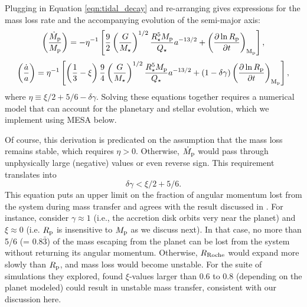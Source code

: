 \documentclass{svjour3}                     %
\begin{document}
Plugging in Equation \ref{eqn:tidal_decay} and re-arranging gives expressions for the mass loss rate and the accompanying evolution of the semi-major axis:
\begin{equation}
\left( \frac{\dot{M}_{\rm p}}{M_{\rm p}} \right) = -\eta^{-1} \left[ \frac{9}{2} \left( \frac{G}{M_{\star}} \right)^{1/2} \frac{R_{\star}^5 M_{\rm p}}{Q_{\star}} a^{-13/2} + \left( \frac{\partial \ln R_{\rm p}}{\partial t} \right)_{\rm M_{\rm p}} \right],
\label{eqn:RLO_mass_loss_rate}
\end{equation}
\begin{equation}
\left( \frac{\dot{a}}{a} \right) = \eta^{-1} \left[\left( \frac{1}{3} - \xi \right) \frac{9}{4} \left( \frac{G}{M_{\star}} \right)^{1/2} \frac{R_{\star}^5 M_{\rm p}}{Q_{\star}} a^{-13/2} + \left( 1 - \delta \gamma \right) \left( \frac{\partial \ln R_{\rm p}}{\partial t} \right)_{\rm M_{\rm p}} \right],
\label{eqn:a_evolution_rate}
\end{equation}
where $\eta \equiv \xi/2 + 5/6 - \delta \gamma$. 
Solving these equations together requires a numerical model that can account for the planetary and stellar evolution, which we implement using MESA below. 

Of course, this derivation is predicated on the assumption that the mass loss remains stable, which requires $\eta > 0$. Otherwise, $\dot{M}_{\rm p}$ would pass through unphysically large (negative) values or even reverse sign. This requirement translates into
\begin{equation}
\delta \gamma < \xi/2 + 5/6.
\label{eqn:stability_condition}
\end{equation}
This equation puts an upper limit on the fraction of angular momentum lost from the system during mass transfer and agrees with the result discussed in \cite{2015ApJ...813..101V}. For instance, consider $\gamma \approx 1$ (i.e., the accretion disk orbits very near the planet) and $\xi \approx 0$ (i.e. $R_{\rm p}$ is insensitive to $M_{\rm p}$ as we discuss next). In that case, no more than 5/6 (= $0.8\bar{3}$) of the mass escaping from the planet can be lost from the system without returning its angular momentum. Otherwise, $R_{\rm Roche}$ would expand more slowly than $R_{\rm p}$, and mass loss would become unstable. For the suite of simulations they explored, \cite{2015ApJ...813..101V} found $\xi$-values larger than 0.6 to 0.8 (depending on the planet modeled) could result in unstable mass transfer, consistent with our discussion here. 
\end{document}
